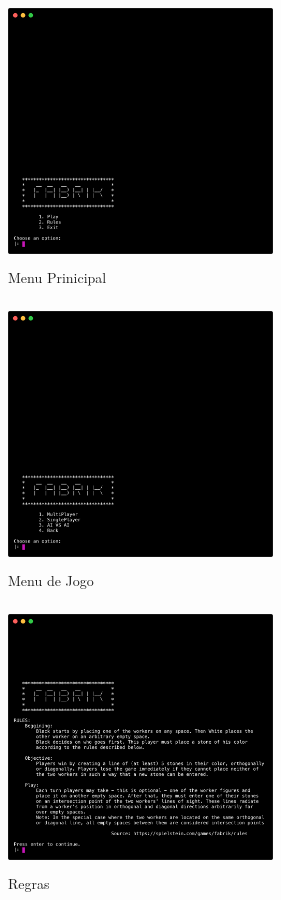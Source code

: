 \documentclass[a4paper]{article}
\begin{document}
\begin{figure}[h!]
\begin{center}
\includegraphics[height=7cm,width=7cm]{images/fabrik_start.png}
\caption{Menu Prinicipal}
\label{Figura 1}
\end{center}
\end{figure}

\begin{figure}[h!]
\begin{center}
\includegraphics[height=7cm,width=7cm]{images/fabrik_menu.png}
\caption{Menu de Jogo}
\label{Figura 1}
\end{center}
\end{figure}

\begin{figure}[h!]
\begin{center}
\includegraphics[height=7cm,width=7cm]{images/fabrik_rules.png}
\caption{Regras}
\label{Figura 1}
\end{center}
\end{figure}
\end{document}
